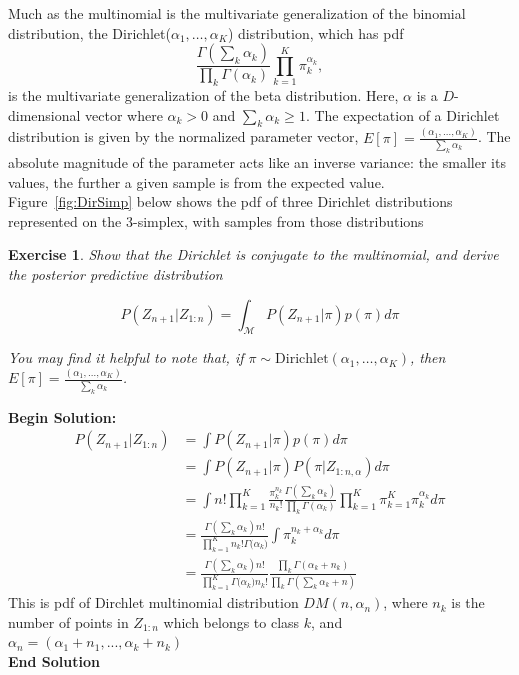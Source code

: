 \documentclass[twoside]{article}
\newcounter{lecnum}
\newtheorem{exercise}{Exercise}[lecnum]
\begin{document}
  Much as the multinomial is the multivariate generalization of the binomial distribution, the Dirichlet($\alpha_1,\dots,\alpha_K$) distribution, which has pdf
  $$\frac{\Gamma(\sum_k \alpha_k)}{\prod_k \Gamma(\alpha_k)} \prod_{k=1}^K \pi_k^{\alpha_k},$$
  is the multivariate generalization of the beta distribution. Here, $\alpha$ is a $D$-dimensional vector where $\alpha_k>0$ and $\sum_k\alpha_k\geq 1$. The expectation of a Dirichlet distribution is given by the normalized parameter vector, $E[\pi] = \frac{(\alpha_1,\dots,\alpha_K)}{\sum_k\alpha_k}$. The absolute magnitude of the parameter acts like an inverse variance: the smaller its values, the further a given sample is from the expected value. Figure~\ref{fig:DirSimp} below shows the pdf of three Dirichlet distributions represented on the 3-simplex, with samples from those distributions

\begin{exercise}
 Show that the Dirichlet is conjugate to the multinomial, and derive the posterior predictive distribution

  $$P(Z_{n+1}|Z_{1:n}) = \int_{\mathcal{M}} P(Z_{n+1}|\pi)p(\pi) d\pi$$

  You may find it helpful to note that, if $\pi\sim \mbox{Dirichlet}(\alpha_1,\dots,\alpha_K)$, then $E[\pi] = \frac{(\alpha_1,\dots,\alpha_K)}{\sum_k\alpha_k}$.
\end{exercise}

\textbf{Begin Solution:}
\begin{equation*}
\begin{split}
P(Z_{n+1}|Z_{1:n}) &= \int P(Z_{n+1}|\pi) p(\pi) d\pi\\
&=\int P(Z_{n+1}|\pi)P(\pi|Z_{1:n,\alpha}) d\pi\\
&=\int n! \prod_{k=1}^K \frac{\pi_k^{n_k}}{n_k!}\frac{\Gamma(\sum_k \alpha_k)}{\prod_k\Gamma(\alpha_k)}\prod_{k=1}^K\pi_{k=1}^K\pi_k^{\alpha_k}d\pi\\
&=\frac{\Gamma(\sum_k \alpha_k)n!}{\prod_{k=1}^K n_k!\Gamma{(\alpha_k})}\int \pi_k^{n_k+\alpha_k} d\pi\\
&=\frac{\Gamma(\sum_k \alpha_k)n!}{\prod_{k=1}^K \Gamma{(\alpha_k})n_k!} \frac{\prod_k \Gamma(\alpha_k+n_k)}{\prod_k\Gamma(\sum_k \alpha_k+n)}
\end{split}
\end{equation*}
This is pdf of Dirchlet multinomial distribution $DM(n,\alpha_n)$, where $n_k$ is the number of points in $Z_{1:n}$ which belongs to class $k$, and $\alpha_n=(\alpha_1+n_1,...,\alpha_k+n_k)$\\
\textbf{End Solution}
\end{document}
